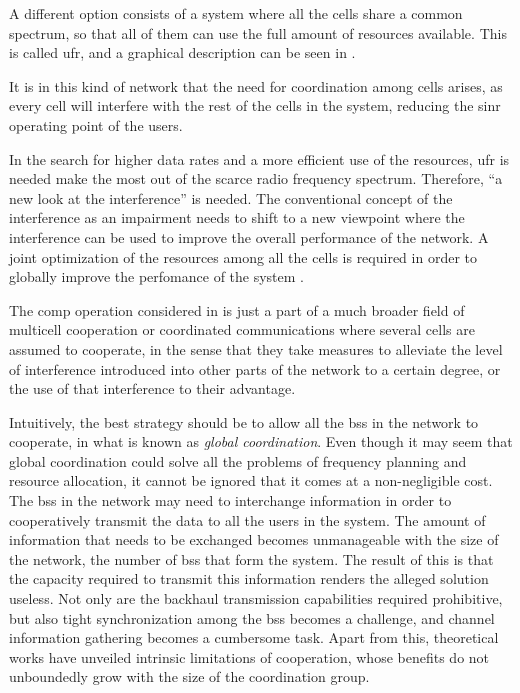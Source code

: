 A different option consists of a system where all the cells share a common
spectrum, so that all of them can use the full amount of resources available.
This is called \gls{ufr}, and a graphical description can be seen in
.

It is in this kind of network that the need for coordination among cells arises,
as every cell will interfere with the rest of the cells in the system, reducing
the \gls{sinr} operating point of the users.

In the search for higher data rates and a more efficient use of the resources,
\gls{ufr} is needed make the most out of the scarce radio frequency spectrum.
Therefore, ``a new look at the interference'' \cite{gesbert10} is needed. The
conventional concept of the interference as an impairment needs to shift to a
new viewpoint where the interference can be used to improve the overall
performance of the network. A joint optimization of the resources among all the
cells is required in order to globally improve the perfomance of the system
\cite{gesbert07}.

The \gls{comp} operation considered in \cite{3gpprel11} is just a part of a much
broader field of multicell cooperation or coordinated communications where
several cells are assumed to cooperate, in the sense that they take measures to
alleviate the level of interference introduced into other parts of the network
to a certain degree, or the use of that interference to their advantage.

Intuitively, the best strategy should be to allow all the \glspl{bs} in the
network to cooperate, in what is known as \emph{global coordination}. Even
though it may seem that global coordination could solve all the problems of
frequency planning and resource allocation, it cannot be ignored that it comes
at a non-negligible cost. The \glspl{bs} in the network may need to interchange
information in order to cooperatively transmit the data to all the users in the
system. The amount of information that needs to be exchanged becomes
unmanageable with the size of the network, \ie the number of \glspl{bs} that
form the system. The result of this is that the capacity required to transmit
this information renders the alleged solution useless. Not only are the backhaul
transmission capabilities required prohibitive, but also tight synchronization
among the \glspl{bs} becomes a challenge, and channel information gathering
becomes a cumbersome task. Apart from this, theoretical works \cite{lozano13}
have unveiled intrinsic limitations of cooperation, whose benefits do not
unboundedly grow with the size of the coordination group.

